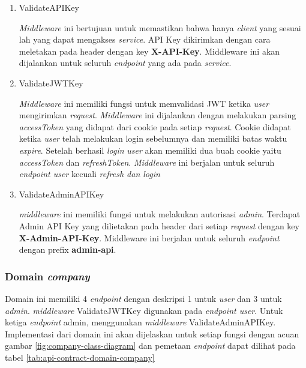 \begin{enumerate}
  \item ValidateAPIKey

        \textit{Middleware} ini bertujuan untuk memastikan bahwa hanya \textit{client} yang sesuai lah yang dapat mengakses \textit{service}. API Key dikirimkan dengan cara meletakan pada header dengan key \textbf{X-API-Key}. Middleware ini akan dijalankan untuk seluruh \textit{endpoint} yang ada pada \textit{service}.

  \item ValidateJWTKey

        \textit{Middleware} ini memiliki fungsi untuk memvalidasi JWT ketika \textit{user} mengirimkan \textit{request}. \textit{Middleware} ini dijalankan dengan melakukan parsing \textit{accessToken} yang didapat dari cookie pada setiap \textit{request}. Cookie didapat ketika \textit{user} telah melakukan login sebelumnya dan memiliki batas waktu \textit{expire}. Setelah berhasil \textit{login} \textit{user} akan memiliki dua buah cookie yaitu \textit{accessToken} dan \textit{refreshToken}.  \textit{Middleware} ini berjalan untuk seluruh \textit{endpoint user} kecuali \textit{refresh dan login}


  \item ValidateAdminAPIKey

        \textit{middleware} ini memiliki fungsi untuk melakukan autorisasi \textit{admin}. Terdapat Admin API Key yang dilietakan pada header dari setiap \textit{request} dengan key \textbf{X-Admin-API-Key}. Middleware ini berjalan untuk seluruh \textit{endpoint} dengan prefix \textbf{admin-api}.
\end{enumerate}


\subsubsection{Domain \textit{company}}

Domain ini memiliki 4 \textit{endpoint} dengan deskripsi 1 untuk \textit{user} dan 3 untuk \textit{admin}. \textit{middleware} ValidateJWTKey digunakan pada \textit{endpoint user}. Untuk ketiga \textit{endpoint} admin, menggunakan \textit{middleware} ValidateAdminAPIKey. Implementasi dari domain ini akan dijelaskan untuk setiap fungsi dengan acuan gambar \ref{fig:company-class-diagram} dan pemetaan \textit{endpoint} dapat dilihat pada tabel \ref{tab:api-contract-domain-company}


